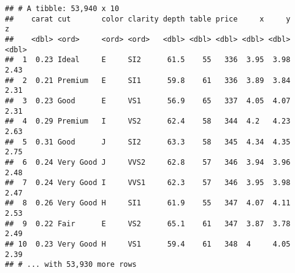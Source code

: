 \documentclass[
]{article}
\newenvironment{Shaded}{\begin{snugshade}}{\end{snugshade}}
\newcommand{\AttributeTok}[1]{\textcolor[rgb]{0.77,0.63,0.00}{#1}}
\newcommand{\CommentTok}[1]{\textcolor[rgb]{0.56,0.35,0.01}{\textit{#1}}}
\newcommand{\ControlFlowTok}[1]{\textcolor[rgb]{0.13,0.29,0.53}{\textbf{#1}}}
\newcommand{\DecValTok}[1]{\textcolor[rgb]{0.00,0.00,0.81}{#1}}
\newcommand{\FunctionTok}[1]{\textcolor[rgb]{0.00,0.00,0.00}{#1}}
\newcommand{\NormalTok}[1]{#1}
\newcommand{\SpecialCharTok}[1]{\textcolor[rgb]{0.00,0.00,0.00}{#1}}
\newcommand{\StringTok}[1]{\textcolor[rgb]{0.31,0.60,0.02}{#1}}
\begin{document}
\begin{Shaded}
\end{Shaded}

\begin{verbatim}
## # A tibble: 53,940 x 10
##    carat cut       color clarity depth table price     x     y     z
##    <dbl> <ord>     <ord> <ord>   <dbl> <dbl> <dbl> <dbl> <dbl> <dbl>
##  1  0.23 Ideal     E     SI2      61.5    55   336  3.95  3.98  2.43
##  2  0.21 Premium   E     SI1      59.8    61   336  3.89  3.84  2.31
##  3  0.23 Good      E     VS1      56.9    65   337  4.05  4.07  2.31
##  4  0.29 Premium   I     VS2      62.4    58   344  4.2   4.23  2.63
##  5  0.31 Good      J     SI2      63.3    58   345  4.34  4.35  2.75
##  6  0.24 Very Good J     VVS2     62.8    57   346  3.94  3.96  2.48
##  7  0.24 Very Good I     VVS1     62.3    57   346  3.95  3.98  2.47
##  8  0.26 Very Good H     SI1      61.9    55   347  4.07  4.11  2.53
##  9  0.22 Fair      E     VS2      65.1    61   347  3.87  3.78  2.49
## 10  0.23 Very Good H     VS1      59.4    61   348  4     4.05  2.39
## # ... with 53,930 more rows
\end{verbatim}

\begin{Shaded}
\end{Shaded}
\end{document}
